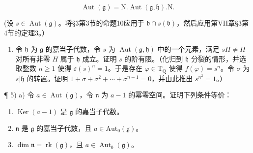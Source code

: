 \[
\operatorname{Aut} (\mathfrak {g}) = \mathrm{N}. \operatorname{Aut} (\mathfrak {g}, \mathfrak {h}). \mathrm{N}.
\]

(设 \(s \in \operatorname{Aut}(\mathfrak{g})\)。将§3第3节的命题10应用于 \(\mathfrak{b} \cap s(\mathfrak{b})\)，然后应用第VII章§3第4节的定理3。）

\begin{enumerate}
\def\labelenumi{\arabic{enumi})}
\setcounter{enumi}{3}
\tightlist
\item
  令 \(\mathfrak{h}\) 为 \(\mathfrak{g}\) 的嘉当子代数，令 \(s\) 为 \(\operatorname{Aut}(\mathfrak{g},\mathfrak{h})\) 中的一个元素，满足 \(sH \neq H\) 对所有非零 \(H\) 属于 \(\mathfrak{h}\) 成立。证明 \(s\) 的阶有限。（化归到 \(\mathfrak{h}\) 分裂的情形，并选取整数 \(n \geq 1\) 使得 \(\varepsilon(s)^n = 1\)。于是存在 \(\varphi \in \mathrm{T}_{\mathrm{Q}}\) 使得 \(f(\varphi) = s^n\)。令 \(\sigma\) 为 \(s|\mathfrak{h}\) 的转置。证明 \(1 + \sigma + \sigma^2 + \cdots + \sigma^{n-1} = 0\)，并由此推出 \(s^{n^2} = 1\)。）
\end{enumerate}

¶ 5) a) 令 \(a \in \operatorname{Aut}(\mathfrak{g})\)，令 \(\mathfrak{n}\) 为 \(a - 1\) 的幂零空间。证明下列条件等价：

\begin{enumerate}
\def\labelenumi{(\roman{enumi})}
\item
  \(\operatorname{Ker}(a - 1)\) 是 \(\mathfrak{g}\) 的嘉当子代数。
\item
  \(\mathfrak{n}\) 是 \(\mathfrak{g}\) 的嘉当子代数，且 \(a\in \mathrm{Aut}_0(\mathfrak{g})\)。
\item
  \(\dim\mathfrak{n}=\operatorname{rk}(\mathfrak{g})\)，且 \(a\in\operatorname{Aut}_{0}(\mathfrak{g})\)。
\end{enumerate}

